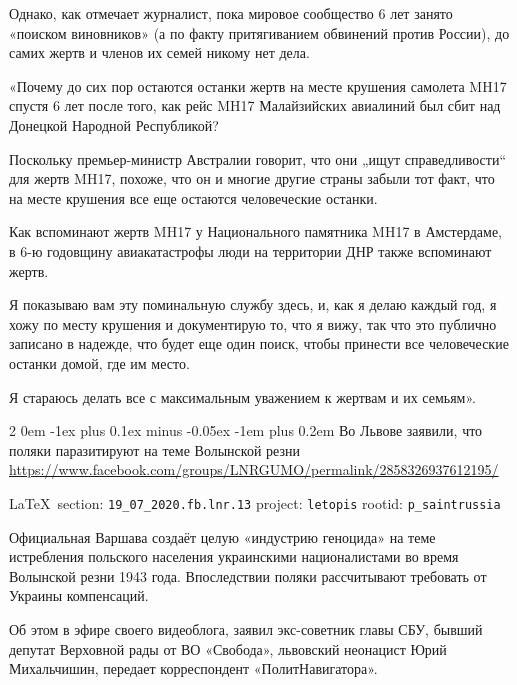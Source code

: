 \documentclass[a4paper,11pt]{extreport}
\makeatletter
\renewcommand\subsection{%
  \clearpage
    \@startsection{subsection}%
    {2}%
    {0em}%
    {-1ex plus 0.1ex minus -0.05ex}%
    {-1em plus 0.2em}%
    {\scshape\bfseries\Large}%
}
\makeatother
\begin{document}
Однако, как отмечает журналист, пока мировое сообщество 6 лет занято «поиском
виновников» (а по факту притягиванием обвинений против России), до самих жертв
и членов их семей никому нет дела.

«Почему до сих пор остаются останки жертв на месте крушения самолета MH17
спустя 6 лет после того, как рейс MH17 Малайзийских авиалиний был сбит над
Донецкой Народной Республикой?

Поскольку премьер-министр Австралии говорит, что они „ищут справедливости“ для
жертв MH17, похоже, что он и многие другие страны забыли тот факт, что на месте
крушения все еще остаются человеческие останки.

Как вспоминают жертв MH17 у Национального памятника MH17 в Амстердаме, в 6-ю
годовщину авиакатастрофы люди на территории ДНР также вспоминают жертв.

Я показываю вам эту поминальную службу здесь, и, как я делаю каждый год, я хожу
по месту крушения и документирую то, что я вижу, так что это публично записано
в надежде, что будет еще один поиск, чтобы принести все человеческие останки
домой, где им место.

Я стараюсь делать все с максимальным уважением к жертвам и их семьям».
  
 
 
  
\subsection{Во Львове заявили, что поляки паразитируют на теме Волынской резни}
\label{sec:19_07_2020.fb.lnr.13}
\url{https://www.facebook.com/groups/LNRGUMO/permalink/2858326937612195/}

\vspace{0.5cm}
{\small\LaTeX~section: \verb|19_07_2020.fb.lnr.13| project: \verb|letopis| rootid: \verb|p_saintrussia|}
\vspace{0.5cm}

Официальная Варшава создаёт целую «индустрию геноцида» на теме истребления
польского населения украинскими националистами во время Волынской резни 1943
года. Впоследствии поляки рассчитывают требовать от Украины компенсаций.

Об этом в эфире своего видеоблога, заявил экс-советник главы СБУ, бывший
депутат Верховной рады от ВО «Свобода», львовский неонацист Юрий Михальчишин,
передает корреспондент «ПолитНавигатора».
\end{document}
